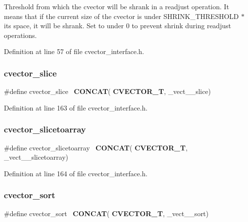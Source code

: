 Threshold from which the cvector will be shrank in a readjust operation. It means that if the current size of the cvector is under S\+H\+R\+I\+N\+K\+\_\+\+T\+H\+R\+E\+S\+H\+O\+LD $\ast$ its space, it will be shrank. Set to under 0 to prevent shrink during readjust operations. 

Definition at line 57 of file cvector\+\_\+interface.\+h.

\mbox{\label{cvector__interface_8h_a19178a8e9548e20ef127fecc36df0bcf}} 
\subsubsection{cvector\+\_\+slice}
{\footnotesize\ttfamily \#define cvector\+\_\+slice~\textbf{ C\+O\+N\+C\+AT}(\textbf{ C\+V\+E\+C\+T\+O\+R\+\_\+T}, \+\_\+vect\+\_\+\+\_\+slice)}



Definition at line 163 of file cvector\+\_\+interface.\+h.

\mbox{\label{cvector__interface_8h_aa222f3c71e732d2358f6cecb3bdda92f}} 
\subsubsection{cvector\+\_\+slicetoarray}
{\footnotesize\ttfamily \#define cvector\+\_\+slicetoarray~\textbf{ C\+O\+N\+C\+AT}(\textbf{ C\+V\+E\+C\+T\+O\+R\+\_\+T}, \+\_\+vect\+\_\+\+\_\+slicetoarray)}



Definition at line 164 of file cvector\+\_\+interface.\+h.

\mbox{\label{cvector__interface_8h_a1aa0dce34ea6ec1a2c066676cebf2a6a}} 
\subsubsection{cvector\+\_\+sort}
{\footnotesize\ttfamily \#define cvector\+\_\+sort~\textbf{ C\+O\+N\+C\+AT}(\textbf{ C\+V\+E\+C\+T\+O\+R\+\_\+T}, \+\_\+vect\+\_\+\+\_\+sort)}



